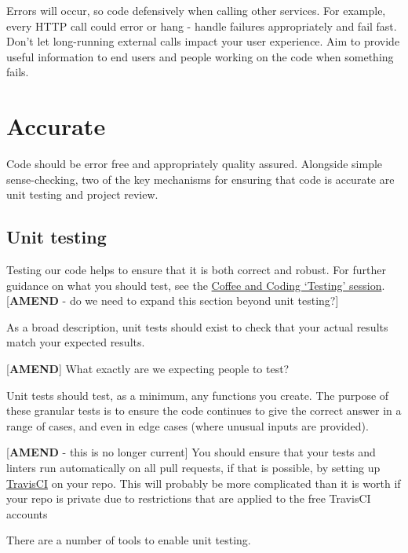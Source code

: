 \documentclass[]{book}
\begin{document}
Errors will occur, so code defensively when calling other services.
For example, every HTTP call could error or hang - handle failures appropriately and fail fast. Don't let long-running external calls impact your user experience. Aim to provide useful information to end users and people working on the code when something fails.

\hypertarget{accurate}{%
\chapter{Accurate}\label{accurate}}

Code should be error free and appropriately quality assured. Alongside simple sense-checking, two of the key mechanisms for ensuring that code is accurate are unit testing and project review.

\hypertarget{unittest}{%
\section{Unit testing}\label{unittest}}

Testing our code helps to ensure that it is both correct and robust. For further guidance on what you should test, see the \href{https://github.com/moj-analytical-services/coffee-and-coding-public/tree/master/2019-12-06\%20Testing\%20as\%20part\%20of\%20an\%20Analytical\%20Project}{Coffee and Coding `Testing' session}. {[}\textbf{AMEND} - do we need to expand this section beyond unit testing?{]}

As a broad description, unit tests should exist to check that your actual results match your expected results.

{[}\textbf{AMEND}{]} What exactly are we expecting people to test?

Unit tests should test, as a minimum, any functions you create. The purpose of these granular tests is to ensure the code continues to give the correct answer in a range of cases, and even in edge cases (where unusual inputs are provided).

{[}\textbf{AMEND} - this is no longer current{]}
You should ensure that your tests and linters run automatically on all pull requests, if that is possible, by setting up \href{https://travis-ci.org/}{TravisCI} on your repo. This will probably be more complicated than it is worth if your repo is private due to restrictions that are applied to the free TravisCI accounts

There are a number of tools to enable unit testing.
\end{document}
